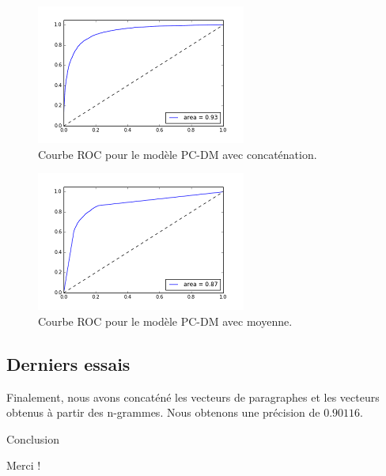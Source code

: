 \documentclass{beamer}
\begin{document}
	\begin{frame}
	\begin{figure}[h]
	\begin{center}
	\includegraphics{images/pvdmconcat.png}
	\caption{Courbe ROC pour le modèle PC-DM avec concaténation.}
	\label{pcdmconcat}
	\end{center}
	\end{figure}
	\end{frame}
	
	\begin{frame}
	\begin{figure}[h]
\begin{center}
\includegraphics{images/pvdmmean.png}
\caption{Courbe ROC pour le modèle PC-DM avec moyenne.}
\label{pcdmmean}
\end{center}
\end{figure}
	\end{frame}

\subsection{Derniers essais}

\begin{frame}
Finalement, nous avons concaténé les vecteurs de paragraphes et les vecteurs obtenus à partir des n-grammes. Nous obtenons une précision de $0.90116$.
\end{frame}

\begin{frame}{Conclusion}
\begin{center}
{\Huge Merci !}
\end{center}
\end{frame}
\end{document}
